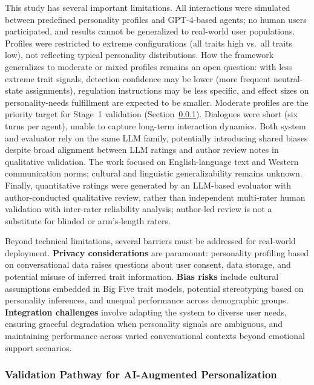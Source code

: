 This study has several important limitations. All interactions were simulated between predefined personality profiles and GPT-4-based agents; no human users participated, and results cannot be generalized to real-world user populations. Profiles were restricted to extreme configurations (all traits high vs.~all traits low), not reflecting typical personality distributions. How the framework generalizes to moderate or mixed profiles remains an open question: with less extreme trait signals, detection confidence may be lower (more frequent neutral-state assignments), regulation instructions may be less specific, and effect sizes on personality-needs fulfillment are expected to be smaller. Moderate profiles are the priority target for Stage~1 validation (Section~\ref{validation-pathway-for-ai-augmented-personalization}). Dialogues were short (six turns per agent), unable to capture long-term interaction dynamics. Both system and evaluator rely on the same LLM family, potentially introducing shared biases despite broad alignment between LLM ratings and author review notes in qualitative validation. The work focused on English-language text and Western communication norms; cultural and linguistic generalizability remains unknown. Finally, quantitative ratings were generated by an LLM-based evaluator with author-conducted qualitative review, rather than independent multi-rater human validation with inter-rater reliability analysis; author-led review is not a substitute for blinded or arm's-length raters.

Beyond technical limitations, several barriers must be addressed for real-world deployment. \textbf{Privacy considerations} are paramount: personality profiling based on conversational data raises questions about user consent, data storage, and potential misuse of inferred trait information. \textbf{Bias risks} include cultural assumptions embedded in Big Five trait models, potential stereotyping based on personality inferences, and unequal performance across demographic groups. \textbf{Integration challenges} involve adapting the system to diverse user needs, ensuring graceful degradation when personality signals are ambiguous, and maintaining performance across varied conversational contexts beyond emotional support scenarios.

\subsubsection{Validation Pathway for AI-Augmented Personalization}\label{validation-pathway-for-ai-augmented-personalization}

